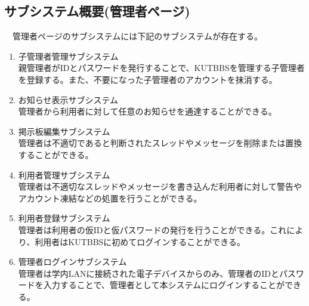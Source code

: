 \documentclass[a4j]{jarticle}
\begin{document}
\subsection{サブシステム概要(管理者ページ)}
　管理者ページのサブシステムには下記のサブシステムが存在する。
\begin{enumerate}
  \item 子管理者管理サブシステム\\
  親管理者がIDとパスワードを発行することで、KUTBBSを管理する子管理者を登録する。また、不要になった子管理者のアカウントを抹消する。
\\

  \item お知らせ表示サブシステム\\
  管理者から利用者に対して任意のお知らせを通達することができる。
\\

  \item 掲示板編集サブシステム\\
  管理者は不適切であると判断されたスレッドやメッセージを削除または置換することができる。
\\

  \item 利用者管理サブシステム\\
  管理者は不適切なスレッドやメッセージを書き込んだ利用者に対して警告やアカウント凍結などの処置を行うことができる。
\\

  \item 利用者登録サブシステム\\
  管理者は利用者の仮IDと仮パスワードの発行を行うことができる。これにより、利用者はKUTBBSに初めてログインすることができる。
\\

  \item 管理者ログインサブシステム\\
  管理者は学内LANに接続された電子デバイスからのみ、管理者のIDとパスワードを入力することで、管理者として本システムにログインすることができる。
\end{enumerate}
\end{document}
